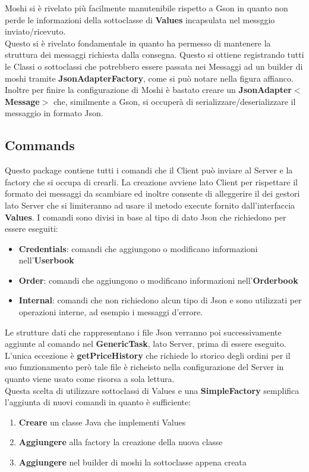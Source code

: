 \documentclass{article}
\begin{document}
Moshi si è rivelato più facilmente manutenibile rispetto a Gson in quanto non perde le informazioni della sottoclasse di \textbf{Values} incapsulata nel messggio inviato/ricevuto.
\\Questo si è rivelato fondamentale in quanto ha permesso di mantenere la struttura dei messaggi richiesta dalla consegna. Questo si ottiene registrando tutti le Classi o sottoclassi che potrebbero essere passata nei Messaggi ad un builder di moshi tramite \textbf{JsonAdapterFactory}, come si può notare nella figura affianco.
Inoltre per finire la configurazione di Moshi è bastato creare un \textbf{JsonAdapter$<$Message$>$} che, similmente a Gson, si occuperà di serializzare/deserializzare il messaggio in formato Json.

\subsection{Commands}
Questo package contiene tutti i comandi che il Client può inviare al Server e la factory che si occupa di crearli. La creazione avviene lato Client per rispettare il formato dei messaggi da scambiare ed inoltre consente di alleggerire il dei gestori lato Server che si limiteranno ad usare il metodo execute fornito dall'interfaccia \textbf{Values}.
I comandi sono divisi in base al tipo di dato Json che richiedono per essere eseguiti:
\begin{itemize}
  \item \textbf{Credentials}: comandi che aggiungono o modificano informazioni nell'\textbf{Userbook}
  \item \textbf{Order}: comandi che aggiungono o modificano informazioni nell'\textbf{Orderbook}
  \item \textbf{Internal}: comandi che non richiedono alcun tipo di Json e sono utilizzati per operazioni interne, ad esempio i messaggi d'errore.
\end{itemize}
Le strutture dati che rappresentano i file Json verranno poi successivamente aggiunte al comando nel \textbf{GenericTask}, lato Server, prima di essere eseguito.\\
L'unica eccezione è \textbf{getPriceHistory} che richiede lo storico degli ordini per il suo funzionamento però tale file è richeisto nella configurazione del Server in quanto viene usato come risorsa a sola lettura. 
\\Questa scelta di utilizzare sottoclassi di Values e una \textbf{SimpleFactory} semplifica l'aggiunta di nuovi comandi in quanto è sufficiente:
\begin{enumerate}
  \item \textbf{Creare} un classe Java che implementi Values
  \item \textbf{Aggiungere} alla factory la creazione della nuova classe
  \item \textbf{Aggiungere} nel builder di moshi la sottoclasse appena creata
\end{enumerate}
\end{document}
